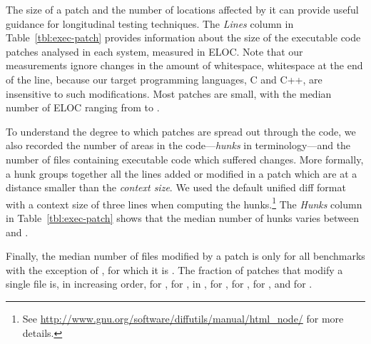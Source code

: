 The size of a patch and the number of locations affected by it can
provide useful guidance for longitudinal testing techniques.  The
\textit{Lines} column in Table~\ref{tbl:exec-patch} provides
information about the size of the executable code patches analysed in
each system, measured in ELOC. Note that our measurements ignore
changes in the amount of whitespace, \eg whitespace at the end of the
line, %
because our target programming languages, C and C++, are insensitive
to such modifications.  Most patches are small, with the median
number of ELOC ranging from \redisPatchMedian to \gitPatchMedian.


To understand the degree to which patches are spread out through the
code, we also recorded the number of areas in the
code---\textit{hunks} in \git terminology---and the number of files
containing executable code which suffered changes.  More formally, a
hunk groups together all the lines added or modified in a patch which
are at a distance smaller than the \textit{context size}.  We used the
default unified diff format with a context size of three lines when
computing the
hunks.\footnote{See \url{http://www.gnu.org/software/diffutils/manual/html_node/}
for more details.}  The \textit{Hunks} column in
Table~\ref{tbl:exec-patch} shows that the median number of hunks
varies between \binutilseHunkThreeMedian and \zeromqeHunkThreeMedian.

Finally, the median number of files modified by a patch is
only \rediseFileMedian for all benchmarks with the exception
of \zeromq, for which it is \zeromqeFileMedian. The fraction of
patches that modify a single file is, in increasing
order, \zeromqOneeFilePatches for \zeromq, \gitOneeFilePatches
for \git, \beanstalkdOneeFilePatches in \beanstalkd, \lighttpdtwoOneeFilePatches
for \lighttpdtwo, \memcachedOneeFilePatches
for \memcached, \redisOneeFilePatches for \redis,
and \binutilsOneeFilePatches for \binutils.


